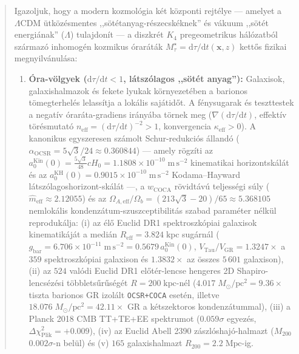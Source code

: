 \documentclass[11pt,a4paper]{article}
\begin{document}
\begin{abstract}
Igazoljuk, hogy a modern kozmológia két központi rejtélye --- amelyet a $\Lambda\mathrm{CDM}$ ütközésmentes ,,sötétanyag-részecskéknek'' és vákuum ,,sötét energiának'' ($\Lambda$) tulajdonít --- a diszkrét $K_4$ pregeometrikus hálózatból származó inhomogén kozmikus óraráták $M_\tau^\star = \mathrm{d}\tau/\mathrm{d}t(\mathbf{x}, z)$ kettős fizikai megnyilvánulása:
\begin{enumerate}
  \item \textbf{Óra-völgyek ($\mathrm{d}\tau/\mathrm{d}t < 1$, látszólagos ,,sötét anyag''):} Galaxisok, galaxishalmazok és fekete lyukak környezetében a barionos tömegterhelés lelassítja a lokális sajátidőt. A fénysugarak és teszttestek a negatív óraráta-gradiens irányába törnek meg ($\nabla(\mathrm{d}\tau/\mathrm{d}t)$, effektív törésmutató $n_{\mathrm{eff}} = (\mathrm{d}\tau/\mathrm{d}t)^{-2} > 1$, konvergencia $\kappa_{\mathrm{eff}} > 0$). A kanonikus egyszeresen számolt Schur-redukciós állandó ($\alpha_{\mathrm{OCSR}} = 5\sqrt{3}/24 \approx 0.360844$) --- amely rögzíti az $a_0^{\mathrm{Kin}}(0) = \frac{5\sqrt{3}}{48} c H_0 = 1.1808 \times 10^{-10}\;\mathrm{m\,s^{-2}}$ kinematikai horizontskálát és az $a_0^{\mathrm{KH}}(0) = 0.9015 \times 10^{-10}\;\mathrm{m\,s^{-2}}$ Kodama--Hayward látszólagoshorizont-skálát ---, a $w_{\mathrm{COCA}}$ rövidtávú teljességi súly ($\hat{m}_{\mathrm{eff}} \approx 2.12055$) és az $\Omega_{A,\mathrm{eff}}/\Omega_b = (213\sqrt{3}-20)/65 \approx 5.368105$ nemlokális kondenzátum-szuszceptibilitás szabad paraméter nélkül reprodukálja: (i) az élő Euclid DR1 spektroszkópiai galaxisok kinematikáját a medián $R_{\mathrm{eff}} = 3.824\;\mathrm{kpc}$ sugárnál ($g_{\mathrm{bar}} = 6.706\times 10^{-11}\;\mathrm{m\,s^{-2}} = 0.5679\,a_0^{\mathrm{Kin}}(0)$, $V_{\mathrm{Tau}}/V_{\mathrm{GR}} = 1.3247\times$ a $359$ spektroszkópiai galaxison és $1.3832\times$ az összes $5\,601$ galaxison), (ii) az $524$ valódi Euclid DR1 előtér-lencse hengeres 2D Shapiro-lencsézési többletsűrűségét $R = 200\;\mathrm{kpc}$-nél ($4.017\;M_\odot/\mathrm{pc}^2 = 9.36\times$ tiszta barionos GR izolált \texttt{OCSR+COCA} esetén, illetve $18.076\;M_\odot/\mathrm{pc}^2 = 42.11\times$ GR a kétszektoros kondenzátummal), (iii) a Planck 2018 CMB TT+TE+EE spektrumot ($0.059\sigma$ egyezés, $\Delta\chi^2_{\mathrm{Plik}} = +0.009$), (iv) az Euclid Abell 2390 zászlóshajó-halmazt ($M_{200}$ $0.002\sigma$-n belül) és (v) $165$ galaxishalmazt $R_{200} = 2.2\;\mathrm{Mpc}$-ig.

\end{enumerate}
\end{abstract}
\end{document}
